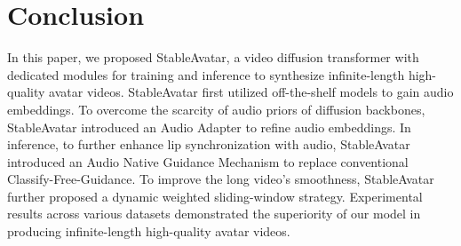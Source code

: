\section{Conclusion}
\label{sec:conclusion}
In this paper, we proposed StableAvatar, a video diffusion transformer with dedicated modules for training and inference to synthesize infinite-length high-quality avatar videos.
StableAvatar first utilized off-the-shelf models to gain audio embeddings. To overcome the scarcity of audio priors of diffusion backbones, StableAvatar introduced an Audio Adapter to refine audio embeddings.
In inference, to further enhance lip synchronization with audio, StableAvatar introduced an Audio Native Guidance Mechanism to replace conventional Classify-Free-Guidance. To improve the long video's smoothness, StableAvatar further proposed a dynamic weighted sliding-window strategy.
Experimental results across various datasets demonstrated the superiority of our model in producing infinite-length high-quality avatar videos.